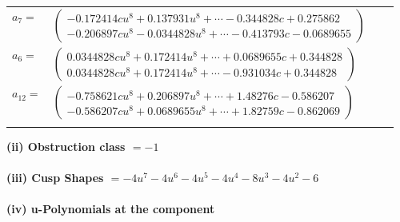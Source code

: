 \documentclass[1p]{elsarticle_modified}
\theoremstyle{definition}
\begin{document}
\begin{tabular}{m{7pt} m{180pt} m{7pt} m{180pt} }
\flushright $a_{7}=$&$\begin{pmatrix}-0.172414 c u^{8}+0.137931 u^{8}+\cdots-0.344828 c+0.275862\\-0.206897 c u^{8}-0.0344828 u^{8}+\cdots-0.413793 c-0.0689655\end{pmatrix}$ \\
\flushright $a_{6}=$&$\begin{pmatrix}0.0344828 c u^{8}+0.172414 u^{8}+\cdots+0.0689655 c+0.344828\\0.0344828 c u^{8}+0.172414 u^{8}+\cdots-0.931034 c+0.344828\end{pmatrix}$ \\
\flushright $a_{12}=$&$\begin{pmatrix}-0.758621 c u^{8}+0.206897 u^{8}+\cdots+1.48276 c-0.586207\\-0.586207 c u^{8}+0.0689655 u^{8}+\cdots+1.82759 c-0.862069\end{pmatrix}$\\&\end{tabular}
\flushleft \textbf{(ii) Obstruction class $= -1$}\\~\\
\flushleft \textbf{(iii) Cusp Shapes $= -4 u^7-4 u^6-4 u^5-4 u^4-8 u^3-4 u^2-6$}\\~\\
\newpage\renewcommand{\arraystretch}{1}
\flushleft \textbf{(iv) u-Polynomials at the component}\newline \\
\end{document}
